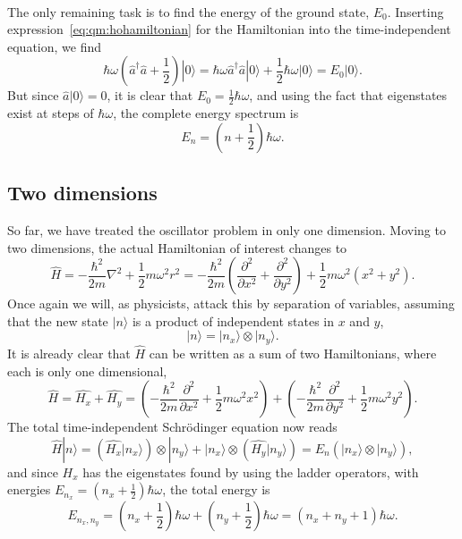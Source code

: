 \paragraph*{}
The only remaining task is to find the energy of the ground state, $E_0$.
Inserting expression~\eqref{eq:qm:hohamiltonian} for the Hamiltonian into the time-independent equation, we find
\begin{equation}
\hbar\omega \left( \hat{a}^{\dagger}\hat{a} + \frac{1}{2} \right) | 0 \rangle
= \hbar\omega  \hat{a}^{\dagger}\hat{a} |0\rangle + \frac{1}{2}\hbar\omega | 0 \rangle = E_0 |0\rangle .
\end{equation}
But since $\hat{a}|0\rangle = 0$, it is clear that $E_0 = \frac{1}{2}\hbar\omega$, and using the fact that eigenstates exist at steps of $\hbar \omega$, the complete energy spectrum is 
\begin{equation}
E_n = \left( n + \frac{1}{2} \right) \hbar \omega .
\end{equation}



\subsection{Two dimensions}
\label{sec:qm:ho2d}
So far, we have treated the oscillator problem in only one dimension.
Moving to two dimensions, the actual Hamiltonian of interest changes to
\begin{equation}
\hat{H}
= -\frac{\hbar^2}{2m}\nabla^2 + \frac{1}{2} m \omega^2 r^2  
= -\frac{\hbar^2}{2m}\left(\frac{\partial^2}{\partial x^2} +\frac{\partial^2}{\partial y^2} \right) + \frac{1}{2} m \omega^2 \left(x^2 + y^2\right) .
\end{equation}
Once again we will, as physicists, attack this by separation of variables, assuming that the new state $|n\rangle$ is a product of independent states in $x$ and $y$,
\begin{equation}
|n\rangle = |n_x \rangle \otimes |n_y \rangle .
\end{equation}
It is already clear that $\hat{H}$ can be written as a sum of two Hamiltonians, where each is only one dimensional,
\begin{equation}
\hat{H} = \hat{H_x} + \hat{H_y} 
= \left(-\frac{\hbar^2}{2m}\frac{\partial^2}{\partial x^2} + \frac{1}{2} m \omega^2 x^2\right) + \left(-\frac{\hbar^2}{2m}\frac{\partial^2}{\partial y^2}  + \frac{1}{2} m \omega^2 y^2\right) .
\end{equation}
The total time-independent Schrödinger equation now reads
\begin{equation}
\hat{H}|n\rangle = \left(\hat{H_x}|n_x \rangle \right) \otimes |n_y \rangle + |n_x \rangle \otimes \left( \hat{H_y} |n_y \rangle \right)
= E_n \left( |n_x \rangle \otimes |n_y \rangle \right),
\end{equation}
and since $H_x$ has the eigenstates found by using the ladder operators, with energies $E_{n_x} = \left(n_x + \frac{1}{2} \right) \hbar\omega$, the total energy is
\begin{equation}
E_{n_x,n_y} 
= \left(n_x + \frac{1}{2}\right) \hbar \omega + \left(n_y + \frac{1}{2}\right) \hbar \omega
= \left(n_x + n_y + 1\right) \hbar \omega .
\end{equation}

